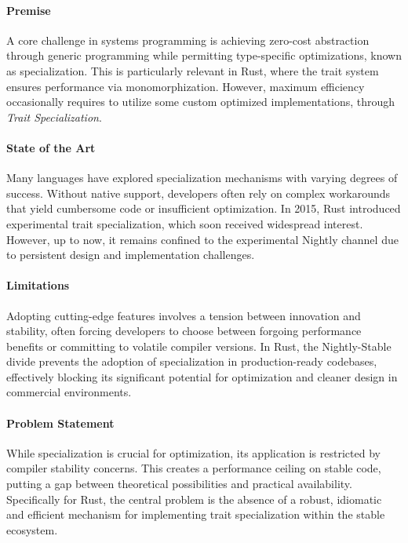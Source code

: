 \paragraph{Premise}
A core challenge in systems programming is achieving zero-cost abstraction through generic programming while permitting type-specific optimizations, known as specialization.
This is particularly relevant in Rust, where the trait system ensures performance via monomorphization.
However, maximum efficiency occasionally requires to utilize some custom optimized implementations, through \textit{Trait Specialization}.

\paragraph{State of the Art}
Many languages have explored specialization mechanisms with varying degrees of success.
Without native support, developers often rely on complex workarounds that yield cumbersome code or insufficient optimization.
In 2015, Rust introduced experimental trait specialization, which soon received widespread interest.
However, up to now, it remains confined to the experimental Nightly channel due to persistent design and implementation challenges.

\paragraph{Limitations}
Adopting cutting-edge features involves a tension between innovation and stability, often forcing developers to choose between forgoing performance benefits or committing to volatile compiler versions.
In Rust, the Nightly-Stable divide prevents the adoption of specialization in production-ready codebases, effectively blocking its significant potential for optimization and cleaner design in commercial environments.

\paragraph{Problem Statement}
While specialization is crucial for optimization, its application is restricted by compiler stability concerns.
This creates a performance ceiling on stable code, putting a gap between theoretical possibilities and practical availability.
Specifically for Rust, the central problem is the absence of a robust, idiomatic and efficient mechanism for implementing trait specialization within the stable ecosystem.


